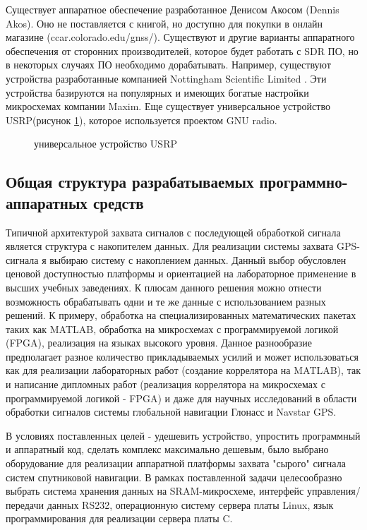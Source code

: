 Существует аппаратное обеспечение разработанное Денисом Акосом (Dennis Akos). Оно не поставляется с книгой, но 
доступно для покупки в онлайн магазине (ccar.colorado.edu/gnss/). Существуют и другие варианты аппаратного обеспечения от сторонних
производителей, которое будет работать с SDR ПО, но в некоторых случаях ПО необходимо дорабатывать. Например, существуют устройства
разработанные компанией Nottingham Scientific Limited \cite{soft_gps1}. Эти устройства базируются на популярных и
имеющих богатые настройки микросхемах компании Maxim. Еще существует универсальное устройство USRP(рисунок \ref{pic:usrp}),
которое используется проектом GNU radio.

\begin{figure}[H]
\begin{center}
\end{center}
\caption{универсальное устройство USRP}
\label{pic:usrp}
\end{figure}

\subsection{Общая структура разрабатываемых программно-аппаратных средств}
\label{razdel13}
Типичной архитектурой захвата сигналов с последующей обработкой сигнала является структура с накопителем данных.
Для реализации системы захвата GPS-сигнала я выбираю систему с накоплением данных. Данный выбор обусловлен
ценовой доступностью платформы и ориентацией на лабораторное применение в высших учебных заведениях.
К плюсам данного решения можно отнести возможность обрабатывать одни и те же данные с использованием разных решений.
К примеру, обработка на специализированных математических пакетах таких как MATLAB, обработка на микросхемах с
программируемой логикой (FPGA), реализация на языках высокого уровня. Данное разнообразие предполагает разное
количество прикладываемых усилий и может использоваться как для реализации лабораторных работ (создание
коррелятора на MATLAB), так и написание дипломных работ (реализация коррелятора на микросхемах с программируемой
логикой - FPGA) и даже для научных исследований в области обработки сигналов системы глобальной навигации
Глонасс и Navstar GPS.

В условиях поставленных целей - удешевить устройство, упростить программный и аппаратный код, сделать
комплекс максимально дешевым, было выбрано оборудование для реализации аппаратной платформы захвата "сырого"
сигнала систем спутниковой навигации. В рамках поставленной задачи целесообразно выбрать система хранения данных
на SRAM-микросхеме, интерфейс управления/передачи данных RS232, операционную систему
сервера платы Linux, язык программирования для реализации сервера платы C.

